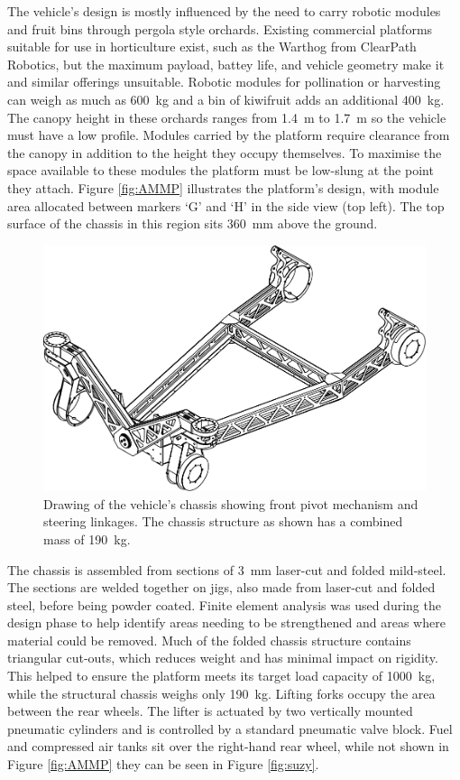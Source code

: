 \documentclass[preprint,authoryear,12pt]{elsarticle}
\begin{document}
        The vehicle's design is mostly influenced by the need to carry robotic modules and fruit bins through pergola style orchards.
        Existing commercial platforms suitable for use in horticulture exist, such as the Warthog from ClearPath Robotics, but the maximum payload, battey life, and vehicle geometry make it and similar offerings unsuitable.
        Robotic modules for pollination or harvesting can weigh as much as \SI{600}{\kilo\gram} and a bin of kiwifruit adds an additional \SI{400}{\kilo\gram}.
        The canopy height in these orchards ranges from \SI{1.4}{\meter} to \SI{1.7}{\meter} so the vehicle must have a low profile.
        Modules carried by the platform require clearance from the canopy in addition to the height they occupy themselves.
        To maximise the space available to these modules the platform must be low-slung at the point they attach.
        Figure \ref{fig:AMMP} illustrates the platform's design, with module area allocated between markers `G' and `H' in the side view (top left).
        The top surface of the chassis in this region sits \SI{360}{\milli\meter} above the ground.

        \begin{figure}[htb]
            \centering
            \includegraphics[width=0.6\linewidth]{imgs/profile_views/AMMP-Chassis-1-20.pdf}
            \caption{Drawing of the vehicle's chassis showing front pivot mechanism and steering linkages. The chassis structure as shown has a combined mass of \SI{190}{\kilo\gram}.}
            \label{fig:AMMPChassis}
        \end{figure}

        The chassis is assembled from sections of \SI{3}{\milli\meter} laser-cut and folded mild-steel.
        The sections are welded together on jigs, also made from laser-cut and folded steel, before being powder coated.
        Finite element analysis was used during the design phase to help identify areas needing to be strengthened and areas where material could be removed.
        Much of the folded chassis structure contains triangular cut-outs, which reduces weight and has minimal impact on rigidity.
        This helped to ensure the platform meets its target load capacity of \SI{1000}{\kilo\gram}, while the structural chassis weighs only \SI{190}{\kilo\gram}.
        Lifting forks occupy the area between the rear wheels.
        The lifter is actuated by two vertically mounted pneumatic cylinders and is controlled by a standard pneumatic valve block.
        Fuel and compressed air tanks sit over the right-hand rear wheel, while not shown in Figure \ref{fig:AMMP} they can be seen in Figure \ref{fig:suzy}.
\end{document}
